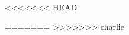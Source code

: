 \documentclass[a4paper]{article}
\begin{document}

\


<<<<<<< HEAD

=======
>>>>>>> charlie

\end{document}

